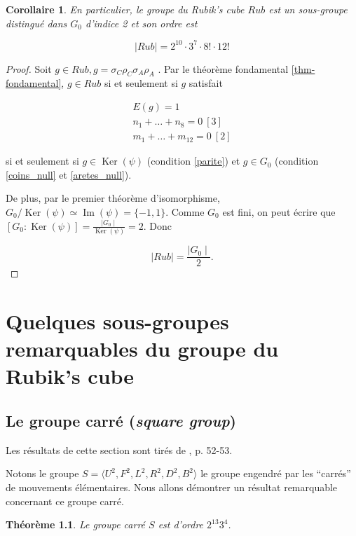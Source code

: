 \documentclass[french]{report}
\newtheorem{theorem}{Théorème}
\newtheorem*{corollary}{Corollaire}
\begin{document}
\begin{corollary}
  En particulier, le groupe du Rubik's cube $Rub$ est un sous-groupe distingué dans $G_0$ d'indice 2 et son ordre est

  $$ \mid Rub \mid = 2 ^{10} \cdot 3 ^{7} \cdot 8! \cdot 12! $$
\end{corollary}

\begin{proof}
  Soit $g \in Rub, g = \sigma_C\rho_C\sigma_A \rho_A$ .
  Par le théorème fondamental \ref{thm-fondamental}, $g \in Rub$ si et seulement si $g$ satisfait

  \begin{gather}
    E(g)=1 \label{parite} \\
    n_1 + \dots + n_8 = 0 \ [  3  ] \label{coins_null} \\
    m_1 + \dots + m _{12} = 0 \ [  2 ]  \label{aretes_null}
  \end{gather}

  si et seulement si $g \in \operatorname{Ker}(\psi)$ (condition \ref{parite}) et $g \in G_0$ (condition \ref{coins_null} et \ref{aretes_null}).

  De plus, par le premier théorème d'isomorphisme, $G_0/ \operatorname{Ker}(\psi) \simeq \operatorname{Im}(\psi) = \{ -1,1 \} $. Comme $G_0$ est fini, on peut écrire que $[G_0 : \operatorname{Ker}(\psi)]  = \frac{\mid G_0 \mid}{\operatorname{Ker}(\psi)}= 2$. Donc

  $$ \mid Rub \mid = \frac{\mid G_0 \mid}{2}.  $$
\end{proof}

\chapter{Quelques sous-groupes remarquables du groupe du Rubik's cube} \label{chap_sous_groupes}

\section{Le groupe carré (\emph{square group})}

Les résultats de cette section sont tirés de \cite{bandelow}, p. 52-53.

Notons le groupe $S = \langle U ^2, F ^2, L ^2, R ^2, D ^2, B ^2 \rangle $ le groupe engendré par les ``carrés'' de mouvements élémentaires. Nous allons démontrer un résultat remarquable concernant ce groupe carré.

\begin{theorem}
  Le groupe carré $S$ est d'ordre $2 ^{13} 3 ^{4}$.
\end{theorem}
\end{document}
